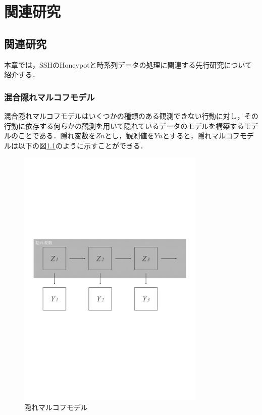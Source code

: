 \chapter{関連研究}
 \label{rela}

\section{関連研究}
本章では，SSHのHoneypotと時系列データの処理に関連する先行研究について紹介する．

\subsection{混合隠れマルコフモデル}
混合隠れマルコフモデルはいくつかの種類のある観測できない行動に対し，その行動に依存する何らかの観測を用いて隠れているデータのモデルを構築するモデルのことである．隠れ変数を$ Zn $とし，観測値を$ Yn $とすると，隠れマルコフモデルは以下の図\ref{fig:hiddenmarkov}のように示すことができる．

\begin{figure}[htbp]
    \centering
    \includegraphics[width=0.8\textwidth]{figures/hiddenmarkov.pdf}
    \caption{隠れマルコフモデル}
    \label{fig:hiddenmarkov}
\end{figure}


